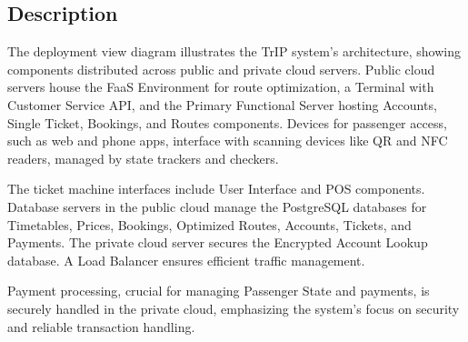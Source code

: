 \subsection*{Description}
The deployment view diagram illustrates the TrIP system's architecture, showing components distributed across public and private cloud servers. Public cloud servers house the FaaS Environment for route optimization, a Terminal with Customer Service API, and the Primary Functional Server hosting Accounts, Single Ticket, Bookings, and Routes components. Devices for passenger access, such as web and phone apps, interface with scanning devices like QR and NFC readers, managed by state trackers and checkers.

The ticket machine interfaces include User Interface and POS components. Database servers in the public cloud manage the PostgreSQL databases for Timetables, Prices, Bookings, Optimized Routes, Accounts, Tickets, and Payments. The private cloud server secures the Encrypted Account Lookup database. A Load Balancer ensures efficient traffic management.

Payment processing, crucial for managing Passenger State and payments, is securely handled in the private cloud, emphasizing the system's focus on security and reliable transaction handling. 


